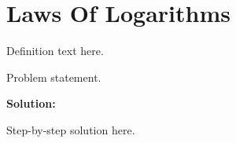\section{Laws Of Logarithms}


\begin{definition}[Term]
Definition text here.
\end{definition}

\begin{example}
Problem statement.

\textbf{Solution:}

Step-by-step solution here.
\end{example}
